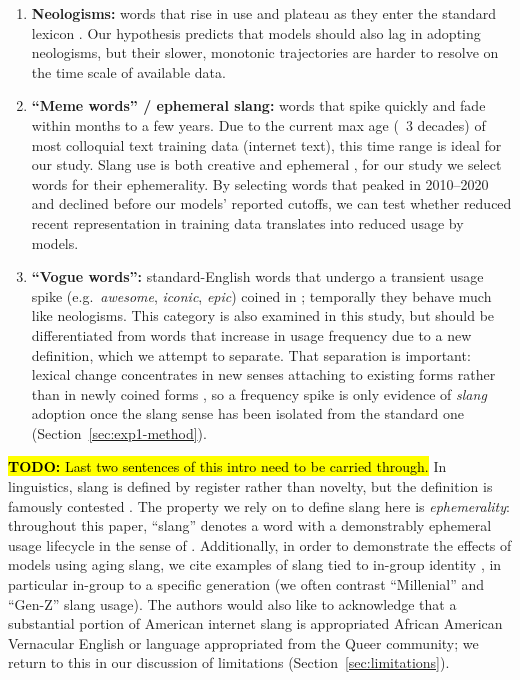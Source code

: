 \documentclass[11pt]{article}
\newcommand{\todo}[1]{\hl{\textbf{TODO:} #1}}
\begin{document}
\begin{enumerate}
  \item \textbf{Neologisms:} words that rise in use and plateau as they enter the standard lexicon \citep{metcalf2002predicting}. Our hypothesis predicts that models should also lag in adopting neologisms, but their slower, monotonic trajectories are harder to resolve on the time scale of available data.

  \item \textbf{``Meme words'' / ephemeral slang:} words that spike quickly and fade within months to a few years. Due to the current max age (~3 decades) of most colloquial text training data (internet text), this time range is ideal for our study. Slang use is both creative and ephemeral \citep{eble1989slang, wu2025slang}, for our study we select words for their ephemerality. By selecting words that peaked in 2010--2020 and declined before our models' reported cutoffs, we can test whether reduced recent representation in training data translates into reduced usage by models.

  \item \textbf{``Vogue words'':} standard-English words that undergo a transient usage spike (e.g.\ \textit{awesome}, \textit{iconic}, \textit{epic}) coined in \citep{fowler1926dictionary}; temporally they behave much like neologisms. This category is also examined in this study, but should be differentiated from words that increase in usage frequency due to a new definition, which we attempt to separate. That separation is important: lexical change concentrates in new senses attaching to existing forms rather than in newly coined forms \citep{hamilton2016polysemy}, so a frequency spike is only evidence of \textit{slang} adoption once the slang sense has been isolated from the standard one (Section~\ref{sec:exp1-method}).
\end{enumerate}

\todo{Last two sentences of this intro need to be carried through.}
In linguistics, slang is defined by register rather than novelty, but the definition is famously contested \citep{lighter1978slang, chapman2010slang}. The property we rely on to define slang here is \textit{ephemerality}: throughout this paper, ``slang'' denotes a word with a demonstrably ephemeral usage lifecycle in the sense of \citet{eble1989slang}. Additionally, in order to demonstrate the effects of models using aging slang, we cite examples of slang tied to in-group identity \citep{eble1989slang, earl1972}, in particular in-group to a specific generation (we often contrast ``Millenial'' and ``Gen-Z'' slang usage). The authors would also like to acknowledge that a substantial portion of American internet slang is appropriated African American Vernacular English or language appropriated from the Queer community; we return to this in our discussion of limitations (Section~\ref{sec:limitations}).
\end{document}
